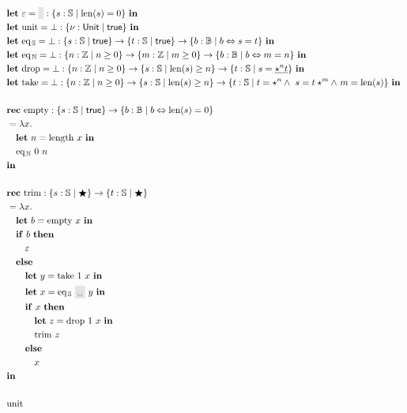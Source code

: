 \documentclass{article}
\newcommand{\Keyword}[1]{\mathbf{#1}\ }
\newcommand{\Let}{\Keyword{let}}
\newcommand{\In}{\Keyword{in}}
\newcommand{\Rec}{\Keyword{rec}}
\newcommand{\If}{\Keyword{if}}
\newcommand{\Then}{\Keyword{then}}
\newcommand{\Else}{\Keyword{else}}
\newcommand{\Unit}{\mathsf{Unit}}
\newcommand{\Int}{\mathbb{Z}}
\newcommand{\String}{\mathbb{S}}
\newcommand{\Bool}{\mathbb{B}}
\newcommand{\Fun}[1]{\mathrm{#1}}
\newcommand{\Var}[1]{#1}
\newcommand{\LitString}[1]{\mathtt{\colorbox{black!10}{\vphantom{X}#1}}}
\newcommand{\LitNum}[1]{#1}
\newcommand{\Ref}[2]{\{#1\mid#2\}}
\newcommand{\true}{\mathsf{true}}
\begin{document}
\begin{align*}
&\Let \Fun{\varepsilon} = \LitString{} : \Ref{s:\String}{\mathrm{len}(s) = 0}\ \In\\
&\Let \Fun{unit} = \bot : \Ref{\nu:\Unit}{\true}\ \In\\
&\Let \Fun{eq_\mathbb{\,S}} = \bot : \Ref{s:\String}{\true} \to \Ref{t:\String}{\true} \to \Ref{b:\Bool}{b \Leftrightarrow s = t}\ \In \\
&\Let \Fun{eq_\mathbb{\,N}} = \bot : \Ref{n:\Int}{n \geq 0} \to \Ref{m:\Int}{m \geq 0} \to \Ref{b:\Bool}{b \Leftrightarrow m = n}\ \In \\
&\Let \Fun{drop} = \bot : \Ref{n:\Int}{n \geq 0} \to \Ref{s : \String}{\mathrm{len}(s) \geq n } \to \Ref{t:\String}{s = \underline{\star^n t}}\ \In \\
&\Let \Fun{take} = \bot : \Ref{n:\Int}{n \geq 0} \to \Ref{s:\String}{\mathrm{len}(s) \geq n} \to \Ref{t:\String}{t = \star^n \land\ s = t\star^m \land\ m = \mathrm{len}(s)}\ \In \\
\\
&\Rec \Fun{empty} : \Ref{s:\String}{\true} \to \Ref{b:\Bool}{b \Leftrightarrow \mathrm{len}(s) = 0}\\
&= \lambda x.\\
&\quad \Let \Var{n} = \Fun{length}\ \Var{x}\ \In \\
&\quad \Fun{eq_\mathbb{\,N}}\ \LitNum{0}\ \Var{n}\\
&\In \\
\\
&\Rec \Fun{trim} : \Ref{s:\String}{\bigstar} \to \Ref{t:\String}{\bigstar}\\
&= \lambda x.\\
&\quad \Let \Var{b} = \Fun{empty}\ \Var{x}\ \In \\
&\quad \If \Var{b}\ \Then\\
&\quad\quad \varepsilon\\
&\quad \Else\\
&\quad\quad \Let \Var{y} = \Fun{take}\ \LitNum{1}\ \Var{x}\ \In\\
&\quad\quad \Let \Var{x} = \Fun{eq_\mathbb{\,S}}\ \LitString{\textvisiblespace}\ \Var{y}\ \In\\
&\quad\quad \If \Var{x}\ \Then\\
&\quad\quad\quad \Let \Var{z} = \Fun{drop}\ \LitNum{1}\ \Var{x}\ \In\\
&\quad\quad\quad \Fun{trim}\ \Var{z}\\
&\quad\quad \Else\\
&\quad\quad\quad x\\
&\In\\
\\
&\Fun{unit}
\end{align*}
\end{document}
